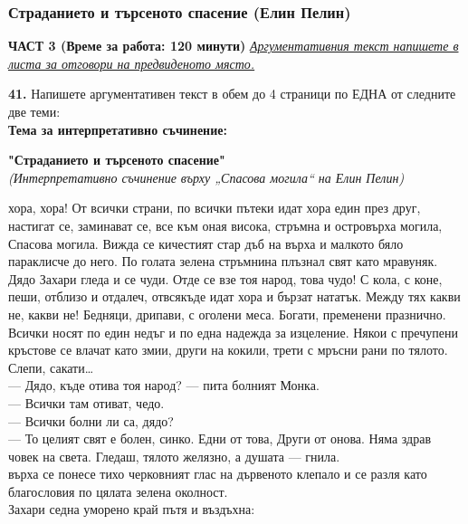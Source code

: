 \documentclass[12pt,a4paper]{article}
\begin{document}
\subsubsection{Страданието и търсеното спасение (Елин Пелин)}
\vspace{0.5cm}
\begin{center}
\textbf{ЧАСТ 3 (Време за работа: 120 минути)}
\vspace{0.2cm}
{\textit{\underline{Аргументативния текст напишете в листа за отговори на предвиденото място.}}}
\vspace{0.1cm}
\end{center}
\textbf{41.} Напишете аргументативен текст в обем до 4 страници по ЕДНА от следните две теми:
\\
\vspace{0.2cm}
\textbf{Тема за интерпретативно съчинение:}
\vspace{0.1cm}
\begin{center}
\textbf{"Страданието и търсеното спасение"}
\\
\textit{(Интерпретативно съчинение върху „Спасова могила“ на Елин Пелин)}
\end{center}
 хора, хора! От всички страни, по всички пътеки идат хора един през друг, настигат се, заминават се, все към оная висока, стръмна и островърха могила, Спасова могила. Вижда се кичестият стар дъб на върха и малкото бяло параклисче до него. По голата зелена стръмнина плъзнал свят като мравуняк. Дядо Захари гледа и се чуди. Отде се взе тоя народ, това чудо! С кола, с коне, пеши, отблизо и отдалеч, отвсякъде идат хора и бързат нататък. Между тях какви не, какви не! Бедняци, дрипави, с оголени меса. Богати, пременени празнично. Всички носят по един недъг и по една надежда за изцеление. Някои с пречупени кръстове се влачат като змии, други на кокили, трети с мръсни рани по тялото. Слепи, сакати…
\\
— Дядо, къде отива тоя народ? — пита болният Монка.
\\
— Всички там отиват, чедо.
\\
— Всички болни ли са, дядо?
\\
— То целият свят е болен, синко. Едни от това, Други от онова. Няма здрав човек на света. Гледаш, тялото желязно, а душата — гнила.
\\
 върха се понесе тихо черковният глас на дървеното клепало и се разля като благословия по цялата зелена околност.
\\
 Захари седна уморено край пътя и въздъхна:
\\
\end{document}
